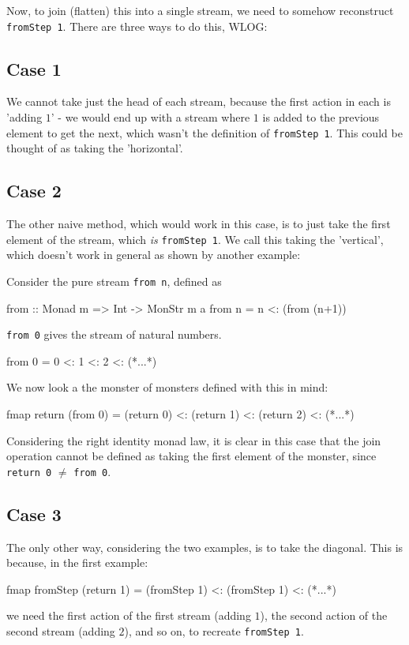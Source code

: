 Now, to join (flatten) this into a single stream, we need to somehow reconstruct \verb+fromStep 1+. There are three ways to do this, WLOG:

\subsection{Case 1}
We cannot take just the head of each stream, because the first action in each is 'adding $1$' - we would end up with a stream where $1$ is added to the previous element to get the next, which wasn't the definition of \verb+fromStep 1+. This could be thought of as taking the 'horizontal'. 

\subsection{Case 2}
The other naive method, which would work in this case, is to just take the first element of the stream, which \emph{is} \verb+fromStep 1+. We call this taking the 'vertical', which doesn't work in general as shown by another example:

Consider the pure stream \verb+from n+, defined as
\begin{haskell}
from :: Monad m => Int -> MonStr m a 
from n = n <: (from (n+1))
\end{haskell}

\verb+from 0+ gives the stream of natural numbers.
\begin{haskell}
from 0 = 0 <: 1 <: 2 <: (*...*)
\end{haskell}

We now look a the monster of monsters defined with this in mind:
\begin{haskell}
fmap return (from 0) = (return 0) <: (return 1) <: (return 2) <: (*...*)
\end{haskell}

Considering the right identity monad law, it is clear in this case that the join operation cannot be defined as taking the first element of the monster, since \verb+return 0+ $\neq$ \verb+from 0+.

\subsection{Case 3}

The only other way, considering the two examples, is to take the diagonal. This is because, in the first example:
\begin{haskell}
fmap fromStep (return 1) = (fromStep 1) <: (fromStep 1) <: (*...*)
\end{haskell}
we need the first action of the first stream (adding $1$), the second action of the second stream (adding $2$), and so on, to recreate  \verb+fromStep 1+.

